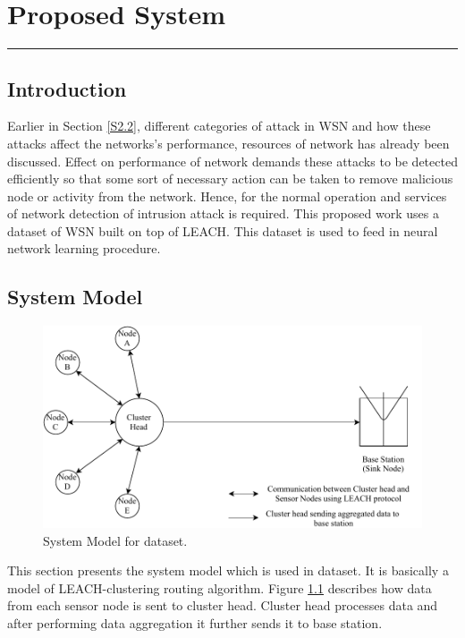 \chapter{Proposed System}
\label{C5} %
\graphicspath{{Figures/PDF}}
\noindent\rule{\linewidth}{2pt}
\section{Introduction} \label{S5.1}
Earlier in Section \ref{S2.2}, different categories of attack in WSN and how these attacks affect the networks's performance, resources of network has already been discussed. Effect on performance of network demands these attacks to be detected efficiently so that some sort of necessary action can be taken to remove malicious node or activity from the network. Hence, for the normal operation and services of network detection of intrusion attack is required. This proposed work uses a dataset of WSN built on top of LEACH. This dataset is used to feed in neural network learning procedure.
\section{System Model} \label{S5.2}
    \begin{figure}[h]
    \center	
    \includegraphics[scale=0.9]{Figures/PDF/SystemModel.pdf}
    \caption{System Model for dataset.}
    \label{SystemModel}	
    \end{figure}
This section presents the system model which is used in dataset. It is basically a model of LEACH-clustering routing algorithm. Figure \ref{SystemModel} describes how data from each sensor node is sent to cluster head. Cluster head processes data and after performing data aggregation it further sends it to base station.
